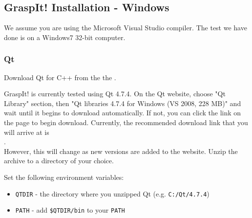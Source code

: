 \subsection{GraspIt! Installation - Windows}

We assume you are using the Microsoft Visual Studio compiler.  The test we have done is on a Windows7 32-bit computer.

\subsubsection{Qt}

Download Qt for C++ from the the .

GraspIt! is currently tested using Qt 4.7.4. On the Qt
website, choose "Qt Library" section, then "Qt libraries 4.7.4 for Windows (VS 2008, 228 MB)" and wait until it begins to download automatically.  If not, you can click the link on the page to begin download. Currently, the recommended download link
that you will arrive at is\\
.\\
However,
this will change as new versions are added to the website. Unzip the
archive to a directory of your choice.

Set the following environment variables:

\begin{itemize}
\item \texttt{QTDIR} - the directory where you unzipped Qt (e.g. \texttt{C:/Qt/4.7.4})
\item \texttt{PATH} - add \texttt{\$QTDIR/bin} to your \texttt{PATH}
\end{itemize}

